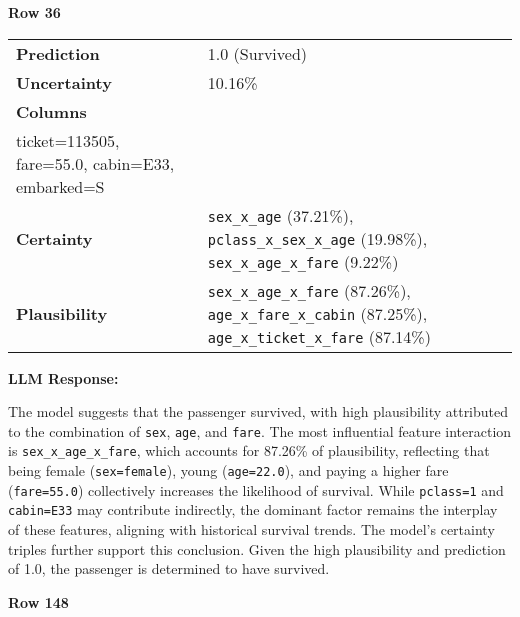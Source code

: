 \documentclass[acmlarge]{acmart}
\begin{document}
\begin{adjustwidth}{0.5cm}{0.5cm}

\textbf{Row 36}
\vspace{0.3em}

\begin{tabularx}{\textwidth}{@{}lX@{}}
\toprule
\textbf{Prediction} & 1.0 (Survived) \\
\textbf{Uncertainty} & 10.16\% \\
\textbf{Columns} & \begin{tabular}[t]{@{}l@{}}
pclass=1, sex=female, age=22.0, sibsp=0, parch=1,\\
ticket=113505, fare=55.0, cabin=E33, embarked=S
\end{tabular} \\
\textbf{Certainty} & \texttt{sex\_x\_age} (37.21\%), \texttt{pclass\_x\_sex\_x\_age} (19.98\%), \texttt{sex\_x\_age\_x\_fare} (9.22\%) \\
\textbf{Plausibility} & \texttt{sex\_x\_age\_x\_fare} (87.26\%), \texttt{age\_x\_fare\_x\_cabin} (87.25\%), \texttt{age\_x\_ticket\_x\_fare} (87.14\%) \\
\bottomrule
\end{tabularx}

\vspace{0.5em}
\noindent\textbf{LLM Response:}

The model suggests that the passenger survived, with high plausibility attributed to the combination of \texttt{sex}, \texttt{age}, and \texttt{fare}. The most influential feature interaction is \texttt{sex\_x\_age\_x\_fare}, which accounts for 87.26\% of plausibility, reflecting that being female (\texttt{sex=female}), young (\texttt{age=22.0}), and paying a higher fare (\texttt{fare=55.0}) collectively increases the likelihood of survival. While \texttt{pclass=1} and \texttt{cabin=E33} may contribute indirectly, the dominant factor remains the interplay of these features, aligning with historical survival trends. The model’s certainty triples further support this conclusion. Given the high plausibility and prediction of 1.0, the passenger is determined to have survived.

\vspace{1em}
\textbf{Row 148}
\vspace{0.3em}


\end{adjustwidth}
\end{document}
